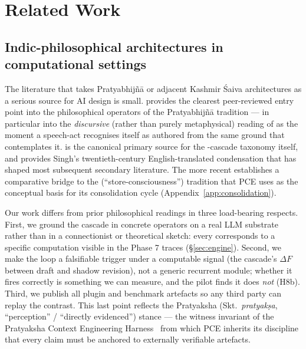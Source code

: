 \section{Related Work}\label{sec:related}

\sloppy

\subsection{Indic-philosophical architectures in computational settings}

The literature that takes Pratyabhij\~n\=a or adjacent Kashmir \'Saiva architectures as a serious source for AI design is small. \citet{Lawrence1996TantricArgumentPEW} provides the clearest peer-reviewed entry point into the philosophical operators of the Pratyabhij\~n\=a tradition --- in particular into the \emph{discursive} (rather than purely metaphysical) reading of  as the moment a speech-act recognises itself as authored from the same ground that contemplates it. \citet{abhinavagupta-isvarapratyabhijna} is the canonical primary source for the -cascade taxonomy itself, and \citet{pratyabhijnahrdayam-singh} provides Singh's twentieth-century English-translated condensation that has shaped most subsequent secondary literature. The more recent \citet{Waldron2003BuddhistUnconscious} establishes a comparative bridge to the  (``store-consciousness'') tradition that PCE uses as the conceptual basis for its consolidation cycle (Appendix~\ref{app:consolidation}).

Our work differs from prior philosophical readings in three load-bearing respects. First, we ground the cascade in concrete operators on a real LLM substrate rather than in a connectionist or theoretical sketch: every  corresponds to a specific computation visible in the Phase 7 traces (\S\ref{sec:engine}). Second, we make the  loop a falsifiable trigger under a computable signal (the cascade's $\Delta F$ between draft and shadow revision), not a generic recurrent module; whether it fires correctly is something we can measure, and the pilot finds it does \emph{not} (H8b). Third, we publish all plugin and benchmark artefacts so any third party can replay the contrast. This last point reflects the Pratyaksha (Skt.\ \emph{pratyak\d{s}a}, ``perception'' / ``directly evidenced'') stance --- the witness invariant of the Pratyaksha Context Engineering Harness~\citep{PratyakshaContextEng2025} from which PCE inherits its discipline that every claim must be anchored to externally verifiable artefacts.

